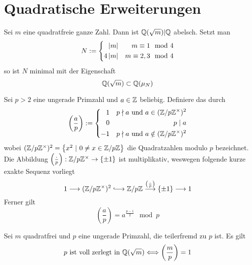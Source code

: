 \documentclass{book}
\newcommand{\Leg}[2]{\left(\frac{#1}{#2}\right)}
\begin{document}
\section{Quadratische Erweiterungen}
\Prop{}
Sei $m$ eine quadratfreie ganze Zahl. Dann ist $\mathbb{Q}(\sqrt{m}) | \mathbb{Q}$ abelsch. Setzt man
\begin{align*}
N := 
\left\lbrace\begin{aligned}
\left|m\right| && m \equiv 1 \mod{4}\\
4\left|m\right| && m \equiv 2,3 \mod{4}
\end{aligned}\right.
\end{align*}
so ist $N$ minimal mit der Eigenschaft
\[ \mathbb{Q}(\sqrt{m}) \subset \mathbb{Q}(\mu_N) \]

Sei $p> 2$ eine ungerade Primzahl und $a \in \mathbb{Z}$ beliebig. Definiere das  durch
\[ \Leg{a}{p} := \left\lbrace 
\begin{aligned}
1 && p \nmid a \text{ und } a \in (\Z/p\Z^\times)^2\\
0 && p \mid a\\
-1 && p \nmid a \text{ und } a \notin (\Z/p\Z^\times)^2
\end{aligned}
\right. \]
wobei $(\Z/p\Z^\times)^2 = \set{x^2}{0\neq x \in \Z/p\Z}$ die Quadratzahlen modulo $p$ bezeichnet.\\
Die Abbildung $\Leg{\cdot}{p} : \Z/p\Z^\times \pfeil{} \{\pm 1\}$ ist multiplikativ, weswegen folgende kurze exakte Sequenz vorliegt
\[ 1 \Pfeil{} (\Z/p\Z^\times)^2 \Inj{} \Z/p\Z \Pfeil{\Leg{\cdot}{p}} \{\pm 1\} \Pfeil{} 1  \]
Ferner gilt
\[ \Leg{a}{p} = a^{\frac{p-1}{2}} \mod{p} \]

Sei $m$ quadratfrei und $p$ eine ungerade Primzahl, die teilerfremd zu $p$ ist. Es gilt
\[ p\text{ ist voll zerlegt in }\Q(\sqrt{m}) \Gdw{} \Leg{m}{p} = 1 \]
\end{document}
